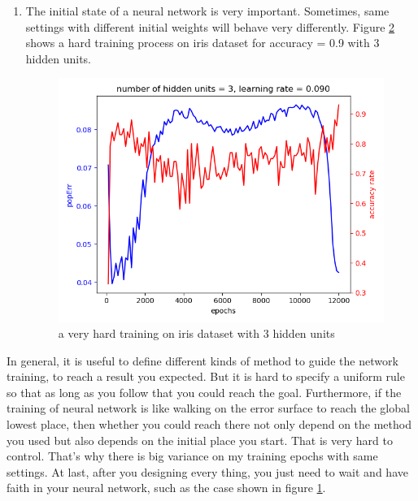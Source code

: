 \documentclass[11pt]{article}
\begin{document}
\begin{enumerate}
\begin{itemize}
\begin{figure}[htb]
\caption{It is lucky that after a long time training, the neural network achieved a high accuracy on 4:4:1 dataset  \label{fig-441}}
\end{figure}
\item 8:3:8: The popErr could be reduced to 0.09, the accuracy is around 0.11 \textasciitilde{} 0.14.
\item iris: After increasing hidden units to 6, the training to high accuracy becomes faster and more steady.
\end{itemize}

\item The initial state of a neural network is very important. Sometimes, same settings with different initial weights will behave very differently. Figure \ref{fig-iris-hard-training} shows a hard training process on iris dataset for accuracy = 0.9 with 3 hidden units. 
\begin{figure}[htb]
\centering
\includegraphics[width=.9\linewidth]{./popErr_vs_accuracy_on_iris_hard_training.png}
\caption{a very hard training on iris dataset with 3 hidden units \label{fig-iris-hard-training}}
\end{figure}
\end{enumerate}


In general, it is useful to define different kinds of method to guide the network training, to reach a result you expected. But it is hard to specify a uniform rule so that as long as you follow that you could reach the goal. Furthermore, if the training of neural network is like walking on the error surface to reach the global lowest place, then whether you could reach there not only depend on the method you used but also depends on the initial place you start. That is very hard to control. That's why there is big variance on my training epochs with same settings. At last, after you designing every thing, you just need to wait and have faith in your neural network, such as the case shown in figure \ref{fig-441}.
\end{document}
